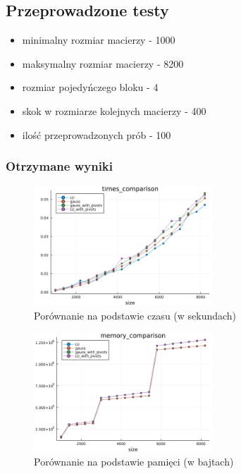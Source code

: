 \documentclass{article}
\begin{document}
\subsection*{Przeprowadzone testy}
	\begin{itemize}
        \item minimalny rozmiar macierzy - 1000
        \item maksymalny rozmiar macierzy - 8200
        \item rozmiar pojedyńczego bloku - 4
        \item skok w rozmiarze kolejnych macierzy - 400
        \item ilość przeprowadzonych prób - 100
    \end{itemize}

\subsubsection*{Otrzymane wyniki}
	\begin{figure}[h]
	    \centering
	    \includegraphics[width=0.6\textwidth]{./graphs/times_comparison.png}
	    \\{Porównanie na podstawie czasu (w sekundach)}
	\end{figure}

\clearpage

	\begin{figure}[h]
	    \centering
	    \includegraphics[width=0.6\textwidth]{./graphs/memory_comparison.png}
	    \\{Porównanie na podstawie pamięci (w bajtach)}
	\end{figure}
\end{document}
